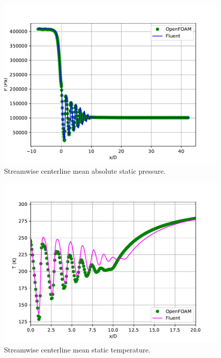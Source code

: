 \documentclass[12pt]{article}
\begin{document}
\begin{figure}[H]
    \centering
    \includegraphics[width=0.925\linewidth]{figs/rhoCentralFoam/p.pdf}
    \caption{Streamwise centerline mean absolute static pressure.}
    \label{fig:p}
\end{figure}

\begin{figure}[H]
    \centering
    \includegraphics[width=0.925\linewidth]{figs/rhoCentralFoam/T.pdf}
    \caption{Streamwise centerline mean static temperature.}
    \label{fig:temp}
\end{figure}
\end{document}

